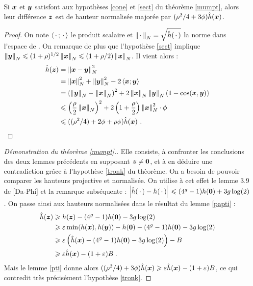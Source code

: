 \begin{lem} \label{pti}
  Si $\p{x}$ et $\p{y}$ satisfont aux hypothèses \ref{cone} et \ref{sect} du
  théorème \ref{mumpt}, alors leur différence $\p{z}$ est de hauteur
  normalisée majorée par $(\rho^2/4 + 3\phi) \hn(\p{x})$.
\end{lem}

\begin{proof}
  On note $\left<\truc ; \truc \right>$ le produit scalaire et $\nv[N]{\truc} =
  \sqrt{\hn(\truc)}$ la norme dans l'espace de . On remarque
  de plus que l'hypothèse \ref{sect} implique $\nv[N]{\p{y}} \le
  (1+\rho)^{1/2}\nv[N]{\p{x}} \le (1+\rho/2) \nv[N]{\p{x}}$. Il vient alors :
  \begin{align*}
  \hn(\p{z}) & = \nv[N]{\p{x}-\p{y}}^2 \\ & = \nv[N]{\p{x}}^2 +
  \nv[N]{\p{y}}^2 - 2\left< \p{x} ; \p{y} \right> \\
  & = \left(\nv[N]{\p{y}} - \nv[N]{\p{x}}\right)^2 +
  2\nv[N]{\p{x}}\nv[N]{\p{y}}\left( 1- \cos(\p{x}, \p{y}) \right) \\
  & \le \left( \frac{\rho}{2}\nv[N]{\p{x}} \right)^2 + 2\left(
  1+\frac{\rho}{2} \right) \nv[N]{\p{x}}^2 \cdot \phi \\
  & \le ((\rho^2/4) + 2\phi + \rho\phi) \hn(\p{x})\pmm{.}\qedhere
  \end{align*}
\end{proof}

\begin{proof}[Démonstration du théorème \ref{mumpt}.]
  Elle consiste, à confronter les conclusions des deux lemmes précédents en
  supposant $\p{z} \neq \OA$, et à en déduire une contradiction grâce à
  l'hypothèse \ref{tronk} du thèorème. On a besoin de pouvoir comparer les
  hauteurs projective et normalisée. On utilise à cet effet le lemme 3.9 de
  [Da-Phi] et la remarque subséquente : $\av[]{\hn(\truc) - h(\truc)} \le
  (4^g-1)h(\OA) + 3g\log(2)$. On passe ainsi aux hauteurs normalisées dans le
  résultat du lemme \ref{papti} :
  \begin{align*}
  \hn(\p{z}) & \ge h(\p{z}) - (4^g-1)h(\OA) - 3g\log(2)\\
  & \ge \eps \min(h(\p{x}), h(\p{y})) - h(\OA) - (4^g-1)h(\OA) - 3g\log(2)
  \\
  & \ge \eps \left(\hn(\p{x}) - (4^g-1)h(\OA) - 3g\log(2)\right) - B \\
  & \ge \eps \hn(\p{x}) - (1+\eps)B \pmm{.}
  \end{align*}
  Mais le lemme \ref{pti} donne alors $((\rho^2/4) + 3\phi) \hn(\p{x}) \ge
  \eps \hn(\p{x}) - (1+\eps)B$, ce qui contredit très précisément l'hypothèse
  \ref{tronk}.
\end{proof}



